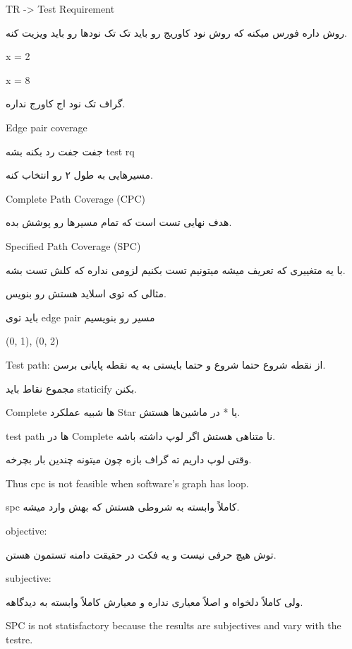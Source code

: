 TR -> Test Requirement

روش داره فورس میکنه که روش نود کاوریج رو باید تک تک نود‌ها رو باید ویزیت کنه.

x = 2 

x = 8

گراف تک نود اج کاورج نداره.

Edge pair coverage

جفت جفت رد بکنه بشه test rq

مسیر‌هایی به طول ۲ رو انتخاب کنه.

Complete Path Coverage (CPC)

هدف نهایی تست است که تمام مسیر‌ها رو پوشش بده.

Specified Path Coverage (SPC)

با یه متغییری که تعریف میشه میتونیم تست بکنیم لزومی نداره که کلش تست بشه.


مثالی که توی اسلاید هستش رو بنویس.

باید توی edge pair مسیر رو بنویسیم

(0, 1), (0, 2)

Test path: از نقطه شروع حتما شروع و حتما بایستی به یه نقطه پایانی برسن.

مجموع نقاط باید staticify بکنن.

Complete ها شبیه عملکرد Star یا * در ماشین‌ها هستش.

test path ها در Complete نا متناهی هستش اگر لوپ داشته باشه.

وقتی لوپ داریم ته گراف بازه چون میتونه چندین بار بچرخه.

Thus cpc is not feasible when software's graph has loop.

spc کاملاً وابسته به شروطی هستش که بهش وارد میشه.

objective: 

توش هیچ حرفی نیست و یه فکت در حقیقت دامنه تستمون هستن.

subjective:

ولی کاملاً دلخواه و اصلاً معیاری نداره و معیارش کاملاً وابسته به دیدگاهه.


SPC is not statisfactory because the results are subjectives and vary with the
testre.

